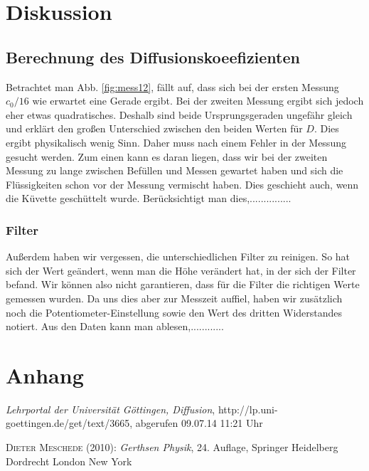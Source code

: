 \documentclass[12pt,a4paper,titlepage,headinclude,bibtotoc]{scrartcl}
\begin{document}
\section{Diskussion}
\label{sec:diskussion}
\subsection{Berechnung des Diffusionskoeefizienten}
Betrachtet man Abb. \ref{fig:mess12}, fällt auf, dass sich bei der ersten Messung $c_0/16$ wie erwartet eine Gerade ergibt. Bei der zweiten Messung ergibt sich jedoch eher etwas quadratisches.
Deshalb sind beide Ursprungsgeraden ungefähr gleich und erklärt den großen Unterschied zwischen den beiden Werten für $D$.
Dies ergibt physikalisch wenig Sinn.
Daher muss nach einem Fehler in der Messung gesucht werden.
Zum einen kann es daran liegen, dass wir bei der zweiten Messung zu lange zwischen Befüllen und Messen gewartet haben und sich die Flüssigkeiten schon vor der Messung vermischt haben.
Dies geschieht auch, wenn die Küvette geschüttelt wurde.
Berücksichtigt man dies,...............

\subsubsection{Filter}
Außerdem haben wir vergessen, die unterschiedlichen Filter zu reinigen.
So hat sich der Wert geändert, wenn man die Höhe verändert hat, in der sich der Filter befand.
Wir können also nicht garantieren, dass für die Filter die richtigen Werte gemessen wurden.
Da uns dies aber zur Messzeit auffiel, haben wir zusätzlich noch die Potentiometer-Einstellung sowie den Wert des dritten Widerstandes notiert.
Aus den Daten kann man ablesen,............

\section{Anhang}

\begin{thebibliography}{100}

	\emph{Lehrportal der Universität Göttingen, Diffusion},
  http://lp.uni-goettingen.de/get/text/3665, abgerufen 09.07.14 11:21 Uhr

	\textsc{Dieter Meschede} (2010): \emph{Gerthsen Physik}, 24. Auflage, Springer Heidelberg
Dordrecht London New York

\end{thebibliography}
\end{document}
